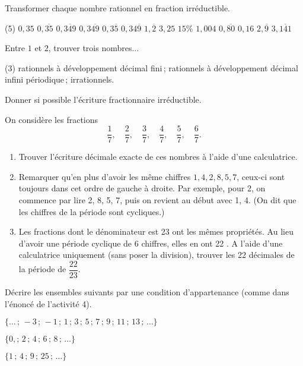 \documentclass[a4paper,12pt]{report}
\begin{document}
\begin{exo}
Transformer chaque nombre rationnel en fraction irréductible.
\begin{tasks}(5)
\task $0,35$ 
\task $0, \overline{35}$
\task $0, \overline{349}$
\task $0,3 \overline{49}$
\task $0,3 \overline{5}$
\task $0,34 \overline{9}$
\task $1, \overline{2}$ 
\task $3,25$
\task $15 \%$
\task $1,004$ 
\task $0, \overline{80}$
\task $0,16$
\task $2, \overline{9}$
\task $3, \overline{141}$
\end{tasks}	
\end{exo}
\begin{exo}
Entre $1$ et $2$, trouver trois nombres...
\begin{center}
	\begin{tasks}(3)
\task rationnels à développement décimal fini\,;
\task rationnels à développement décimal infini périodique\,;
\task irrationnels.
	\end{tasks}
\end{center}
Donner si possible l'écriture fractionnaire irréductible.
\end{exo}

\begin{exo}
On considère les fractions 
\[\dfrac{1}{7}, \quad \dfrac{2}{7}, \quad \dfrac{3}{7}, \quad \dfrac{4}{7}, \quad \dfrac{5}{7}, \quad \dfrac{6}{7}.\]
\begin{enumerate}
\item Trouver l'écriture décimale exacte de ces nombres à l'aide d'une calculatrice.
\item Remarquer qu'en plus d'avoir les même chiffres $1,4,2,8,5,7$, ceux-ci sont toujours dans cet ordre de gauche à droite. Par exemple, pour 2, on commence par lire 2, 8, 5, 7, puis on revient au début avec 1, 4. (On dit que les chiffres de la période sont cycliques.)
\item Les fractions dont le dénominateur est 23 ont les mêmes propriétés. Au lieu d'avoir une période cyclique de 6 chiffres, elles en ont 22 .
A l'aide d'une calculatrice uniquement (sans poser la division), trouver les 22 décimales de la période de $\dfrac{22}{23}$.
\end{enumerate}
\end{exo}





\begin{exo}
Décrire les ensembles suivants par une condition d'appartenance (comme dans l'énoncé de l'activité 4).
\begin{center}
\begin{inlineumerate}
\item $\{\ldots\,;\,-3\,;\,-1\,;\,1\,;\,3\,;\,5\,;\,7\,;\,9\,;\,11\,;\,13\,;\,\ldots\}$
\item $\{0,;\,2\,;\,4\,;\,6\,;\,8\,;\,\ldots\}$
\item $\{1\,;\,4\,;\,9\,;\,25\,;\,\ldots\}$
\end{inlineumerate}
\end{center}
\end{exo}
\end{document}
